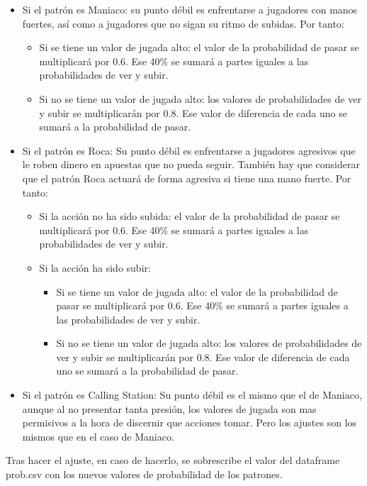 \begin{itemize}
	\item Si el patrón es Maniaco: su punto débil es enfrentarse a jugadores con manos fuertes, así como a jugadores que no sigan su ritmo de subidas. Por tanto:
	\begin{itemize}
		\item  Si se tiene un valor de jugada alto: el valor de la probabilidad de pasar se multiplicará por 0.6. Ese 40\% se sumará a partes iguales a las probabilidades de ver y subir.
		\item Si no se tiene un valor de jugada alto: los valores de probabilidades de ver y subir se multiplicarán por 0.8. Ese valor de diferencia de cada uno se sumará a la probabilidad de pasar.
	\end{itemize}
	\item Si el patrón es Roca: Su punto débil es enfrentarse a jugadores agresivos que le roben dinero en apuestas que no pueda seguir. También hay que considerar que el patrón Roca actuará de forma agresiva si tiene una mano fuerte. Por tanto:
	\begin{itemize}
		\item Si la acción no ha sido subida: el valor de la probabilidad de pasar se multiplicará por 0.6. Ese 40\% se sumará a partes iguales a las probabilidades de ver y subir.
		\item Si la acción ha sido subir:
		\begin{itemize}
			\item Si se tiene un valor de jugada alto: el valor de la probabilidad de pasar se multiplicará por 0.6. Ese 40\% se sumará a partes iguales a las probabilidades de ver y subir.
			\item Si no se tiene un valor de jugada alto: los valores de probabilidades de ver y subir se multiplicarán por 0.8. Ese valor de diferencia de cada uno se sumará a la probabilidad de pasar.
		\end{itemize}
	\end{itemize}

\item Si el patrón es Calling Station: Su punto débil es el mismo que el de Maniaco, aunque al no presentar tanta presión, los valores de jugada son mas permisivos a la hora de discernir que acciones tomar. Pero los ajustes son los mismos que en el caso de Maniaco.
\end{itemize}

Tras hacer el ajuste, en caso de hacerlo, se sobrescribe el valor del dataframe prob.csv con los nuevos valores de probabilidad de los patrones.

